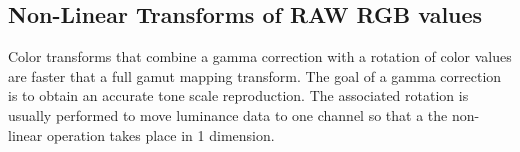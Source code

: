 \documentclass{amsart}
\theoremstyle{definition}
\theoremstyle{remark}
\numberwithin{equation}{section}
\begin{document}
\subsection{Non-Linear Transforms of RAW RGB values}
Color transforms that combine a gamma correction with a rotation of color values are faster that a full gamut mapping transform. The goal of a gamma correction is to obtain an accurate tone scale reproduction.  The associated rotation is usually performed to move luminance data to one channel so that a the non-linear operation takes place in 1 dimension.
\end{document}
